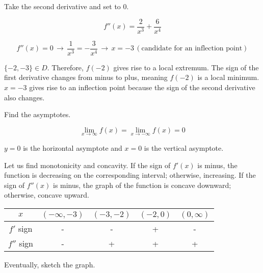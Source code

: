 \documentclass{article}
\begin{document}
\hfill

\noindent Take the second derivative and set to 0.

\begin{equation*}f''(x) = \frac{2}{x^3} + \frac{6}{x^4}\end{equation*}

\begin{equation*}f''(x) = 0\,\rightarrow\,\frac{1}{x^3} = -\frac{3}{x^4}\,\rightarrow\,x = -3\, (\text{candidate for an inflection point})\end{equation*}

\hfill

\noindent  $\{-2, -3\} \in D$. Therefore, $f(-2)$ gives rise to a local extremum. The sign of the first derivative changes from minus to plus, meaning $f(-2)$ is a local minimum. $x=-3$ gives rise to an inflection point because the sign of the second derivative also changes.

\hfill

\noindent Find the asymptotes.

\begin{equation*}\lim_{x\to\infty} f(x) = \lim_{x\to-\infty} f(x) = 0\end{equation*}

\hfill

\noindent $y=0$ is the horizontal asymptote and $x=0$ is the vertical asymptote.

\hfill

\noindent Let us find monotonicity and concavity. If the sign of $f'(x)$ is minus, the function is decreasing on the corresponding interval; otherwise, increasing. If the sign of $f''(x)$ is minus, the graph of the function is concave downward; otherwise, concave upward.

\begin{center}
    \large
    \begin{tabular}{ |c| c c c c| } 
    \hline
        $x$ & $(-\infty, -3)$ & $(-3, -2)$ & $(-2, 0)$ &  $(0, \infty)$ \\
        \hline
        $f'$ sign & - & - & + & - \\
        \hline
        $f''$ sign & - & + & + & + \\
        \hline
    \end{tabular}
\end{center}

\hfill

\noindent Eventually, sketch the graph.
\end{document}
